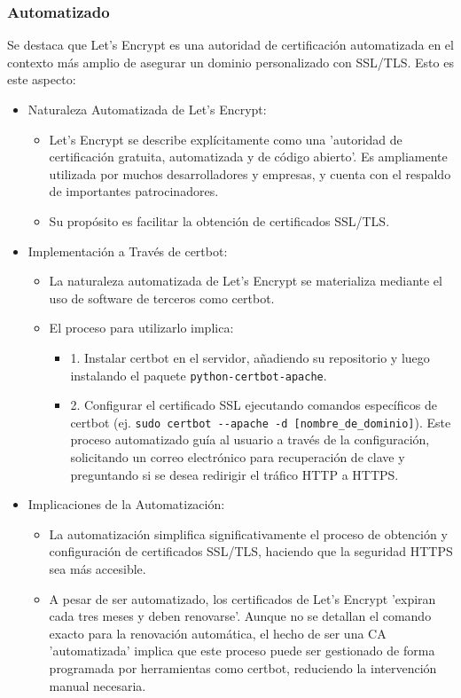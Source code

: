 \documentclass{report}
\begin{document}
\subsubsection{Automatizado}
Se destaca que Let's Encrypt es una autoridad de certificación automatizada en el contexto más amplio de 
asegurar un dominio personalizado con SSL/TLS.
Esto es este aspecto:
\begin{itemize}
    \item Naturaleza Automatizada de Let's Encrypt:
        \begin{itemize}
            \item Let's Encrypt se describe explícitamente como una 'autoridad de certificación gratuita, automatizada 
            y de código abierto'. Es ampliamente utilizada por muchos desarrolladores y empresas, y cuenta con el respaldo de 
            importantes patrocinadores.
            \item Su propósito es facilitar la obtención de certificados SSL/TLS.
        \end{itemize}
    \item Implementación a Través de certbot:
        \begin{itemize}
            \item La naturaleza automatizada de Let's Encrypt se materializa mediante el uso de software de terceros como certbot.
            \item El proceso para utilizarlo implica:
                \begin{itemize}
                    \item 1. Instalar certbot en el servidor, añadiendo su repositorio y luego instalando el paquete \verb|python-certbot-apache|.
                    \item 2. Configurar el certificado SSL ejecutando comandos específicos de certbot 
                    (ej. \verb|sudo certbot --apache -d [nombre_de_dominio]|). Este proceso automatizado guía al usuario a través de la 
                    configuración, solicitando un correo electrónico para recuperación de clave y preguntando si se desea redirigir el 
                    tráfico HTTP a HTTPS.
                \end{itemize}
        \end{itemize}
    \item Implicaciones de la Automatización:
        \begin{itemize}
            \item La automatización simplifica significativamente el proceso de obtención y configuración de certificados SSL/TLS, haciendo 
            que la seguridad HTTPS sea más accesible.
            \item A pesar de ser automatizado, los certificados de Let's Encrypt 'expiran cada tres meses y deben renovarse'. 
            Aunque no se detallan el comando exacto para la renovación automática, el hecho de ser una CA 'automatizada' 
            implica que este proceso puede ser gestionado de forma programada por herramientas como certbot, reduciendo la 
            intervención manual necesaria.
        \end{itemize}
\end{itemize}
\end{document}
